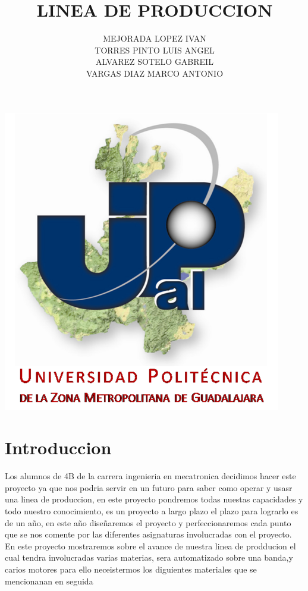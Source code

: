 \documentclass[11pt,a4paper]{article}
\title{LINEA DE PRODUCCION}
\author{MEJORADA LOPEZ IVAN\\TORRES PINTO LUIS ANGEL\\ALVAREZ SOTELO GABREIL\\VARGAS DIAZ MARCO ANTONIO}
\begin{document}
\maketitle

\includegraphics[width=\textwidth]{UPZMG_Prueba_1b.png} 
\newpage
\section{Introduccion}
Los alumnos de 4B de la carrera ingenieria en mecatronica decidimos hacer este proyecto ya que nos podria servir en un futuro para saber como operar y usasr una linea de produccion, en este proyecto pondremos todas nuestas capacidades y todo nuestro conocimiento, es un proyecto a largo plazo el plazo para lograrlo es de un a\~no, en este a\~no dise\~naremos el proyecto y perfeccionaremos cada punto que se nos comente por las diferentes asignaturas involucradas con el proyecto.\\En este proyecto mostraremos sobre el avance de nuestra linea de prodducion el cual tendra involucradas varias materias, sera automatizado sobre una banda,y carios motores para ello neceistermos los diguientes materiales que se mencionanan en seguida 
\\
\\
\end{document}

